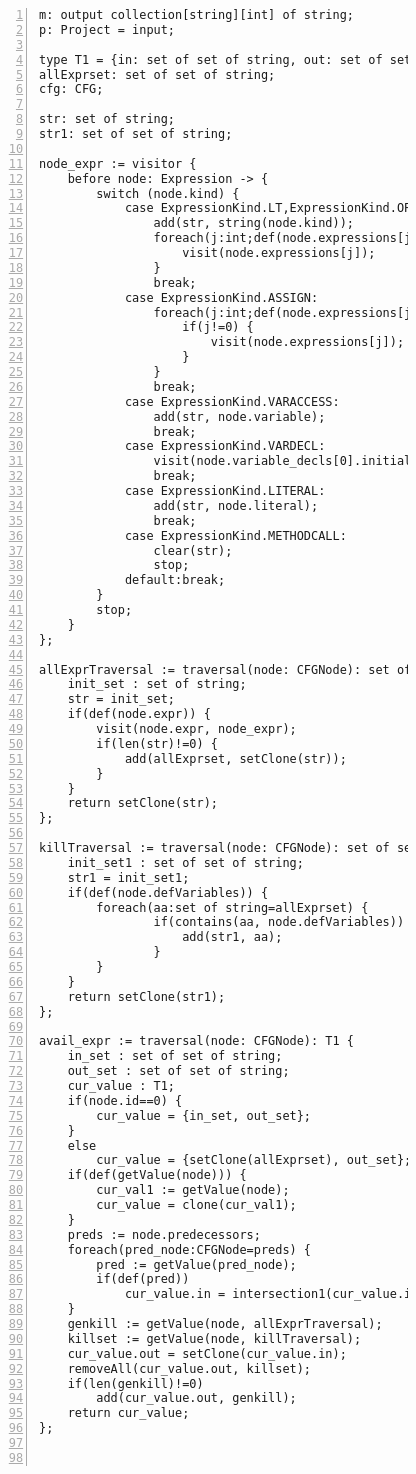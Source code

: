 \begin{figure}[ht!]
\begin{lstlisting}[numbers=left, tabsize=4, escapechar=@, caption={Available expression analysis},label={lst:ae-code},lastline=59] 
m: output collection[string][int] of string;
p: Project = input;

type T1 = {in: set of set of string, out: set of set of string};
allExprset: set of set of string;
cfg: CFG;

str: set of string;
str1: set of set of string;

node_expr := visitor {
	before node: Expression -> {
		switch (node.kind) {
			case ExpressionKind.LT,ExpressionKind.OP_ADD, ExpressionKind.OP_SUB, ExpressionKind.OP_INC, ExpressionKind.OP_MULT, ExpressionKind.OP_DIV, ExpressionKind.OP_MOD, ExpressionKind.OP_DEC, ExpressionKind.GT, ExpressionKind.EQ, ExpressionKind.NEQ, ExpressionKind.LTEQ, ExpressionKind.GTEQ, ExpressionKind.LOGICAL_NOT, ExpressionKind.LOGICAL_AND, ExpressionKind.LOGICAL_OR, ExpressionKind.BIT_AND, ExpressionKind.BIT_OR, ExpressionKind.BIT_NOT, ExpressionKind.BIT_XOR, ExpressionKind.BIT_LSHIFT, ExpressionKind.BIT_RSHIFT, ExpressionKind.BIT_UNSIGNEDRSHIFT:
				add(str, string(node.kind)); 
				foreach(j:int;def(node.expressions[j])) {
					visit(node.expressions[j]);
				}
				break;
			case ExpressionKind.ASSIGN:
				foreach(j:int;def(node.expressions[j])) {
					if(j!=0) {
						visit(node.expressions[j]);
					}
				}
				break;
			case ExpressionKind.VARACCESS:
				add(str, node.variable);
				break;
			case ExpressionKind.VARDECL:
				visit(node.variable_decls[0].initializer);
				break;
			case ExpressionKind.LITERAL:
				add(str, node.literal);
				break;
			case ExpressionKind.METHODCALL:
				clear(str);
				stop;
			default:break;
		}
		stop;
	}
};

allExprTraversal := traversal(node: CFGNode): set of string {
	init_set : set of string;
	str = init_set;
	if(def(node.expr)) {
		visit(node.expr, node_expr);
		if(len(str)!=0) {
			add(allExprset, setClone(str));
		}
	}
	return setClone(str);
};

killTraversal := traversal(node: CFGNode): set of set of string {
	init_set1 : set of set of string;
	str1 = init_set1;
	if(def(node.defVariables)) {
		foreach(aa:set of string=allExprset) {
				if(contains(aa, node.defVariables)) {
					add(str1, aa);
				}
		}
	}
	return setClone(str1);
};

avail_expr := traversal(node: CFGNode): T1 {
	in_set : set of set of string;
	out_set : set of set of string;
	cur_value : T1;
	if(node.id==0) {
		cur_value = {in_set, out_set};
	}
	else
		cur_value = {setClone(allExprset), out_set};
	if(def(getValue(node))) {
		cur_val1 := getValue(node);
		cur_value = clone(cur_val1);
	}
	preds := node.predecessors;
	foreach(pred_node:CFGNode=preds) {	
		pred := getValue(pred_node);
		if(def(pred))
			cur_value.in = intersection1(cur_value.in, pred.out);
	}
	genkill := getValue(node, allExprTraversal);
	killset := getValue(node, killTraversal);
	cur_value.out = setClone(cur_value.in);
	removeAll(cur_value.out, killset);
	if(len(genkill)!=0)
		add(cur_value.out, genkill);
	return cur_value;
};



\end{lstlisting}
\end{figure}
